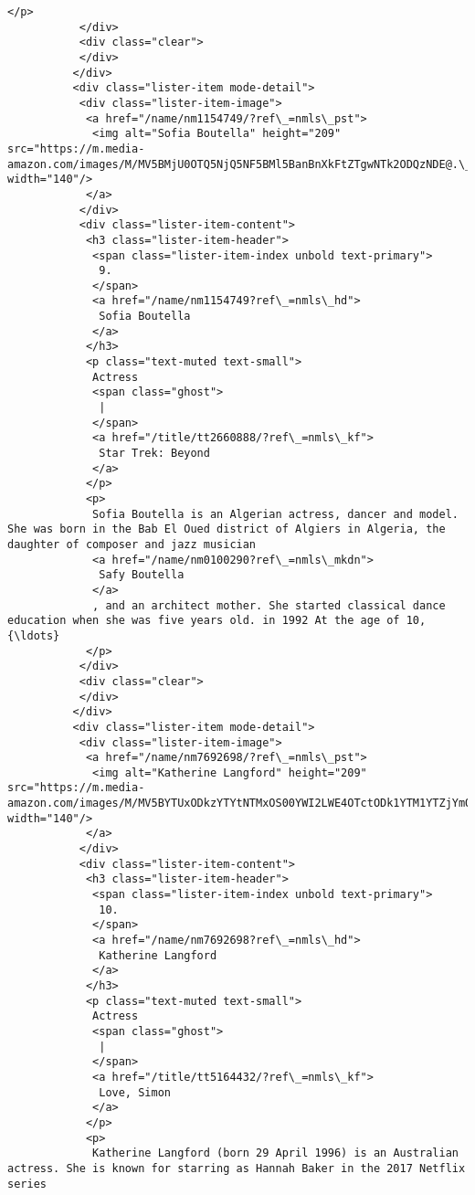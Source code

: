 \documentclass[11pt]{article}
\begin{document}
\begin{Verbatim}[commandchars=\\\{\}]
            </p>
           </div>
           <div class="clear">
           </div>
          </div>
          <div class="lister-item mode-detail">
           <div class="lister-item-image">
            <a href="/name/nm1154749/?ref\_=nmls\_pst">
             <img alt="Sofia Boutella" height="209" src="https://m.media-amazon.com/images/M/MV5BMjU0OTQ5NjQ5NF5BMl5BanBnXkFtZTgwNTk2ODQzNDE@.\_V1\_UY209\_CR10,0,140,209\_AL\_.jpg" width="140"/>
            </a>
           </div>
           <div class="lister-item-content">
            <h3 class="lister-item-header">
             <span class="lister-item-index unbold text-primary">
              9.
             </span>
             <a href="/name/nm1154749?ref\_=nmls\_hd">
              Sofia Boutella
             </a>
            </h3>
            <p class="text-muted text-small">
             Actress
             <span class="ghost">
              |
             </span>
             <a href="/title/tt2660888/?ref\_=nmls\_kf">
              Star Trek: Beyond
             </a>
            </p>
            <p>
             Sofia Boutella is an Algerian actress, dancer and model. She was born in the Bab El Oued district of Algiers in Algeria, the daughter of composer and jazz musician
             <a href="/name/nm0100290?ref\_=nmls\_mkdn">
              Safy Boutella
             </a>
             , and an architect mother. She started classical dance education when she was five years old. in 1992 At the age of 10, {\ldots}
            </p>
           </div>
           <div class="clear">
           </div>
          </div>
          <div class="lister-item mode-detail">
           <div class="lister-item-image">
            <a href="/name/nm7692698/?ref\_=nmls\_pst">
             <img alt="Katherine Langford" height="209" src="https://m.media-amazon.com/images/M/MV5BYTUxODkzYTYtNTMxOS00YWI2LWE4OTctODk1YTM1YTZjYmQ3XkEyXkFqcGdeQXVyNjM0NjkwNTI@.\_V1\_UX140\_CR0,0,140,209\_AL\_.jpg" width="140"/>
            </a>
           </div>
           <div class="lister-item-content">
            <h3 class="lister-item-header">
             <span class="lister-item-index unbold text-primary">
              10.
             </span>
             <a href="/name/nm7692698?ref\_=nmls\_hd">
              Katherine Langford
             </a>
            </h3>
            <p class="text-muted text-small">
             Actress
             <span class="ghost">
              |
             </span>
             <a href="/title/tt5164432/?ref\_=nmls\_kf">
              Love, Simon
             </a>
            </p>
            <p>
             Katherine Langford (born 29 April 1996) is an Australian actress. She is known for starring as Hannah Baker in the 2017 Netflix series

\end{Verbatim}
\end{document}
